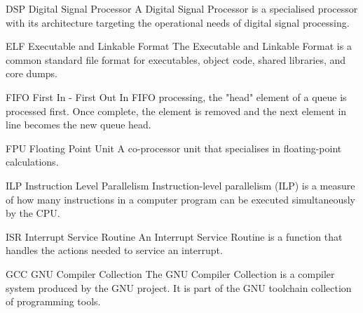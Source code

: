 
%
  {DSP}%
  {Digital Signal Processor}%
  {A Digital Signal Processor is a specialised processor with its architecture %
   targeting the operational needs of digital signal processing.}%


%
  {ELF}%
  {Executable and Linkable Format}%
  {The Executable and Linkable Format is a common standard file format for
   executables, object code, shared libraries, and core dumps.}%


%
  {FIFO}%
  {First In - First Out}%
  {In FIFO processing, the "head" element of a queue is processed first.
   Once complete, the element is removed and the next element in line becomes
   the new queue head.}%

%
  {FPU}%
  {Floating Point Unit}%
  {A co-processor unit that specialises in floating-point calculations.}%

%
  {ILP}%
  {Instruction Level Parallelism}%
  {Instruction-level parallelism (ILP) is a measure of how many instructions in
   a computer program can be executed simultaneously by the \gls{CPU}.}%

%
  {ISR}%
  {Interrupt Service Routine}%
  {An Interrupt Service Routine is a function that handles the actions needed
   to service an interrupt.}%


%
  {GCC}%
  {GNU Compiler Collection}%
  {The GNU Compiler Collection is a compiler system produced by the
   GNU project. It is part of the GNU toolchain collection of programming
   tools.}%


